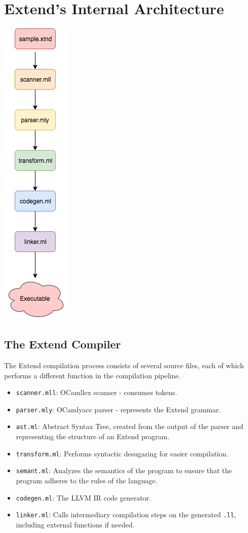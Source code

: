 \chapter{Extend's Internal Architecture}

\begin{center}
  \includegraphics[width=.20\textwidth]{img/Execution.png}
\end{center}

\newpage

\section{The Extend Compiler}
The Extend compilation process consists of several source files, each of which performs a different function in the compilation pipeline.

\begin{itemize}
  \item \texttt{scanner.mll}: OCamllex scanner - consumes tokens.
  \item \texttt{parser.mly}: OCamlyacc parser - represents the Extend grammar.
  \item \texttt{ast.ml}: Abstract Syntax Tree, created from the output of the parser and representing the structure of an Extend program.
  \item \texttt{transform.ml}: Performs syntactic desugaring for easier compilation.
  \item \texttt{semant.ml}: Analyzes the semantics of the program to ensure that the program adheres to the rules of the language.
  \item \texttt{codegen.ml}: The LLVM IR code generator.
  \item \texttt{linker.ml}: Calls intermediary compilation steps on the generated \texttt{.ll}, including external functions if needed.
\end{itemize}


